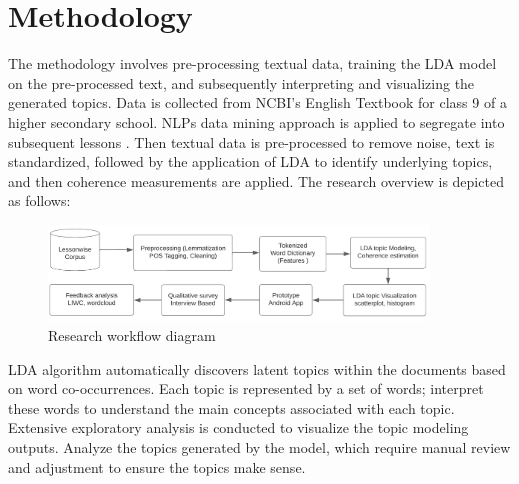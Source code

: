 \documentclass[sn-mathphys,Numbered]{sn-jnl}%
\theoremstyle{thmstyleone}%
\theoremstyle{thmstyletwo}%
\theoremstyle{thmstylethree}%
\begin{document}
\section{Methodology}\label{methods} 
The methodology involves pre-processing textual data, training the LDA model on the pre-processed text, and subsequently interpreting and visualizing the generated topics. Data is collected from NCBI's English Textbook for class 9 of a higher secondary school. NLPs data mining approach is applied to segregate into subsequent lessons \cite{kao_natural_2007, mccarthy_applied_2012}. Then textual data is pre-processed to remove noise, text is standardized, followed by the application of LDA to identify underlying topics, and then coherence measurements are applied. The research overview is depicted as follows:

\begin{figure}[h!]
\centering
\includegraphics[width=0.9\textwidth]{methodology.png}
\caption{Research workflow diagram}
\end{figure}

LDA algorithm automatically discovers latent topics within the documents based on word co-occurrences. Each topic is represented by a set of words; interpret these words to understand the main concepts associated with each topic. Extensive exploratory analysis is conducted to visualize the topic modeling outputs. Analyze the topics generated by the model, which require manual review and adjustment to ensure the topics make sense. 
\end{document}
